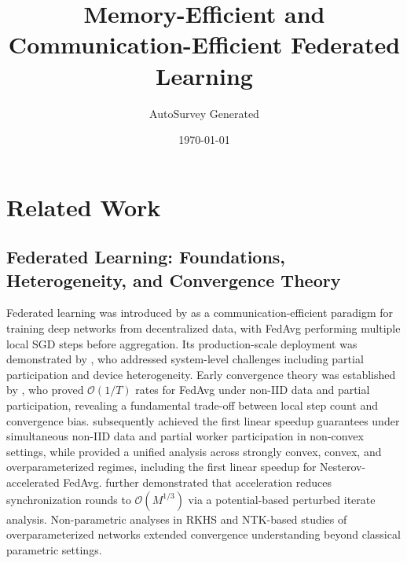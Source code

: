 \documentclass[11pt]{article}
\title{Memory-Efficient and Communication-Efficient Federated Learning}
\author{AutoSurvey Generated}
\date{\today}
\begin{document}
\maketitle

\section{Related Work}

\subsection{Federated Learning: Foundations, Heterogeneity, and Convergence Theory}

Federated learning was introduced by \citet{mcmahan2017communication} as a communication-efficient paradigm for training deep networks from decentralized data, with FedAvg performing multiple local SGD steps before aggregation. Its production-scale deployment was demonstrated by \citet{bonawitz2019towards}, who addressed system-level challenges including partial participation and device heterogeneity. Early convergence theory was established by \citet{li2019convergence}, who proved $\mathcal{O}(1/T)$ rates for FedAvg under non-IID data and partial participation, revealing a fundamental trade-off between local step count and convergence bias. \citet{Yang2021AchievingLS} subsequently achieved the first linear speedup guarantees under simultaneous non-IID data and partial worker participation in non-convex settings, while \citet{qu2023unified} provided a unified analysis across strongly convex, convex, and overparameterized regimes, including the first linear speedup for Nesterov-accelerated FedAvg. \citet{Yuan2020FederatedAS} further demonstrated that acceleration reduces synchronization rounds to $\mathcal{O}(M^{1/3})$ via a potential-based perturbed iterate analysis. Non-parametric analyses in RKHS \citep{su2023non} and NTK-based studies of overparameterized networks \citep{jian2025widening} extended convergence understanding beyond classical parametric settings.
\end{document}
